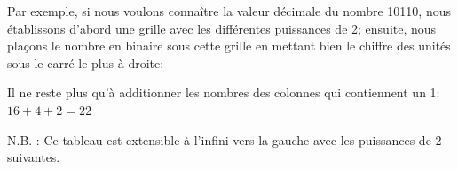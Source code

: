 \documentclass[11pt, a4paper]{book}
\begin{document}
\begin{center}
\end{center} 

Par exemple, si nous voulons connaître la valeur décimale du nombre 10110, nous établissons d'abord une grille avec les différentes puissances de 2; ensuite, nous plaçons le nombre en binaire sous cette grille en mettant bien le chiffre des unités sous le carré le plus à droite:

\begin{center}
\end{center}

Il ne reste plus qu'à additionner les nombres des colonnes qui contiennent un 1: $16 + 4 + 2=22$

N.B. : Ce tableau est extensible à l'infini vers la gauche avec les puissances de 2 suivantes.
\end{document}
